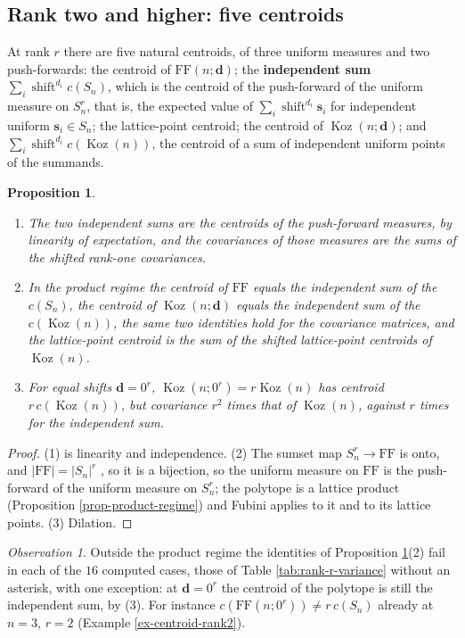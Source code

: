 \documentclass[11pt, a4paper, abstract=yes]{scrartcl}
\theoremstyle{definition}
\theoremstyle{remark}
\theoremstyle{plain}
\newtheorem{proposition}[definition]{Proposition}
\newcommand{\vek}[1]{\boldsymbol{#1}}
\theoremstyle{remark}
\newtheorem{observation}[definition]{Observation}
\theoremstyle{plain}
\newcommand{\Koz}{\operatorname{Koz}}
\newcommand{\shift}{\operatorname{shift}}
\newcommand{\FF}{\mathrm{FF}}
\newcommand{\leandiscof}[1]{\tikz[baseline=-0.6ex]\fill[#1] (0,0) circle (0.6ex);}
\newcommand{\leanfull}{\leandiscof{leanfull}}
\newcommand{\leanmark}[1]{\leavevmode{\reversemarginpar\marginnote{\raggedleft#1}}}
\let\autocite\cite
\begin{document}
\subsection{Rank two and higher: five centroids}
\label{sec:org3b0ad2c}

At rank \(r\) there are five natural centroids, of three uniform measures and two push-forwards:
the centroid of \(\FF(n;\vek d)\); the
\textbf{independent sum} \(\sum_i\shift^{d_i}c(S_n)\), which is the centroid of the push-forward of the
uniform measure on \(S_n^r\), that is, the expected value of \(\sum_i\shift^{d_i}\vek s_i\) for
independent uniform \(\vek s_i\in S_n\); the lattice-point
centroid; the centroid of \(\Koz(n;\vek d)\); and \(\sum_i\shift^{d_i}c(\Koz(n))\), the centroid of a
sum of independent uniform points of the summands.

\begin{proposition}
\begin{enumerate}
\item \leanmark{\leanfull}The two independent sums are the centroids of the push-forward measures, by linearity of
expectation, and the covariances of those measures are the sums of the shifted rank-one
covariances.
\item In the product regime the centroid of \(\FF\) equals the independent sum of the \(c(S_n)\), the
centroid of \(\Koz(n;\vek d)\) equals the independent sum of the \(c(\Koz(n))\), the same two
identities hold for the covariance matrices, and the lattice-point centroid is the sum of the shifted lattice-point centroids
of \(\Koz(n)\).
\item For equal shifts \(\vek d=0^r\), \(\Koz(n;0^r)=r\Koz(n)\) has centroid \(r\,c(\Koz(n))\), but
covariance \(r^2\) times that of \(\Koz(n)\), against \(r\) times for the independent sum.
\end{enumerate}
\label{prop-pushforward}
\end{proposition}

\begin{proof}
(1) is linearity and independence. (2) The sumset map \(S_n^r\to\FF\) is onto, and
\(\lvert\FF\rvert=\lvert S_n\rvert^r\) \autocite[Proposition 42]{SnellmanArticle2}, so it is a bijection, so the uniform measure on \(\FF\) is the push-forward of the
uniform measure on \(S_n^r\); the polytope is a lattice product (Proposition \ref{prop-product-regime})
and Fubini applies to it and to its lattice points. (3) Dilation.
\end{proof}

\begin{observation}
Outside the product regime the identities of Proposition \ref{prop-pushforward}(2) fail in each of the
\(16\) computed cases, those of Table \ref{tab:rank-r-variance} without an asterisk, with one exception:
at \(\vek d=0^r\) the centroid of the polytope is still the independent sum, by (3). For instance
\(c(\FF(n;0^r))\ne r\,c(S_n)\) already at \(n=3\), \(r=2\) (Example \ref{ex-centroid-rank2}).
\label{obs-pushforward-fails}
\end{observation}
\end{document}
